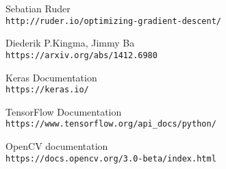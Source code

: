 \begin{thebibliography}{99}
Sebatian Ruder
\\\texttt{http://ruder.io/optimizing-gradient-descent/}

Diederik P.Kingma, Jimmy Ba
\\\texttt{https://arxiv.org/abs/1412.6980}

Keras Documentation
\\\texttt{https://keras.io/}

TensorFlow Documentation
\\\texttt{https://www.tensorflow.org/api_docs/python/}

OpenCV documentation
\\\texttt{https://docs.opencv.org/3.0-beta/index.html}

\end{thebibliography}
